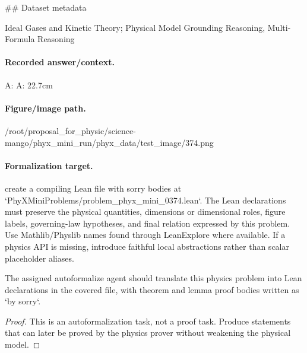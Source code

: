 \#\# Dataset metadata

Ideal Gases and Kinetic Theory; Physical Model Grounding Reasoning, Multi-Formula Reasoning

\paragraph{Recorded answer/context.}
A: A: 22.7cm

\paragraph{Figure/image path.}
/root/proposal\_for\_physic/science-mango/phyx\_mini\_run/phyx\_data/test\_image/374.png

\paragraph{Formalization target.}
create a compiling Lean file with sorry bodies at `PhyXMiniProblems/problem\_phyx\_mini\_0374.lean`. The Lean declarations must preserve the physical quantities, dimensions or dimensional roles, figure labels, governing-law hypotheses, and final relation expressed by this problem.
Use Mathlib/Physlib names found through LeanExplore where available. If a physics API is missing, introduce faithful local abstractions rather than scalar placeholder aliases.

\begin{theorem}
\label{thm:physics:phyx_mini_0374:target}
The assigned autoformalize agent should translate this physics problem into Lean declarations in the covered file, with theorem and lemma proof bodies written as `by sorry`.
\end{theorem}
\begin{proof}
This is an autoformalization task, not a proof task. Produce statements that can later be proved by the physics prover without weakening the physical model.
\end{proof}

